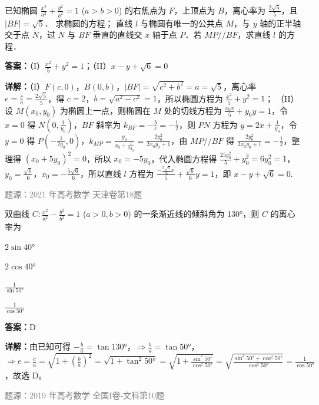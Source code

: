 \begin{question}
已知椭圆 $\frac{x^2}{a^2} + \frac{y^2}{b^2} = 1$ ($a > b > 0$) 的右焦点为 $F$，上顶点为 $B$，离心率为 $\frac{2\sqrt{5}}{5}$，且 $|BF| = \sqrt{5}$．
求椭圆的方程；
直线 $l$ 与椭圆有唯一的公共点 $M$，与 $y$ 轴的正半轴交于点 $N$，过 $N$ 与 $BF$ 垂直的直线交 $x$ 轴于点 $P$．若 $MP // BF$，求直线 $l$ 的方程．
\begin{solution}
\textbf{答案：}（I）$\frac{x^2}{5} + y^2 = 1$；（II）$x - y + \sqrt{6} = 0$

\textbf{详解：}（I）$F(c,0)$，$B(0,b)$，$|BF| = \sqrt{c^2+b^2} = a = \sqrt{5}$，离心率 $e = \frac{c}{a} = \frac{2\sqrt{5}}{5}$，得 $c=2$，$b = \sqrt{a^2-c^2} = 1$，所以椭圆方程为 $\frac{x^2}{5} + y^2 = 1$；
（II）设 $M(x_0,y_0)$ 为椭圆上一点，则椭圆在 $M$ 处的切线方程为 $\frac{x_0 x}{5} + y_0 y = 1$，令 $x=0$ 得 $N\left(0,\frac{1}{y_0}\right)$，$BF$ 斜率为 $k_{BF} = -\frac{b}{c} = -\frac{1}{2}$，则 $PN$ 方程为 $y = 2x + \frac{1}{y_0}$，令 $y=0$ 得 $P\left(-\frac{1}{2y_0},0\right)$，$k_{MP} = \frac{y_0}{x_0+\frac{1}{2y_0}} = \frac{2y_0^2}{2x_0 y_0+1}$，由 $MP // BF$ 得 $\frac{2y_0^2}{2x_0 y_0+1} = -\frac{1}{2}$，整理得 $(x_0+5y_0)^2=0$，所以 $x_0 = -5y_0$，代入椭圆方程得 $\frac{25y_0^2}{5}+y_0^2=6y_0^2=1$，$y_0 = \frac{\sqrt{6}}{6}$，$x_0 = -\frac{5\sqrt{6}}{6}$，所以直线 $l$ 方程为 $\frac{-\frac{5\sqrt{6}}{6}x}{5} + \frac{\sqrt{6}}{6}y = 1$，即 $x - y + \sqrt{6}=0$.

\textcolor{gray}{\footnotesize 题源：2021 年高考数学 天津卷第18题}
\end{solution}
\end{question}


\begin{question}
双曲线 $C: \frac{x^2}{a^2} - \frac{y^2}{b^2} = 1$ ($a>0,b>0$) 的一条渐近线的倾斜角为 130°，则 $C$ 的离心率为
\begin{choices}
\item $2\sin40°$
\item $2\cos40°$
\item $\frac{1}{\sin50°}$
\item $\frac{1}{\cos50°}$
\end{choices}
\begin{solution}
\textbf{答案：}D

\textbf{详解：}由已知可得 $-\frac{b}{a} = \tan130°$，$\Rightarrow \frac{b}{a} = \tan50°$，$\Rightarrow e = \frac{c}{a} = \sqrt{1+\left(\frac{b}{a}\right)^2} = \sqrt{1+\tan^2 50°} = \sqrt{1+\frac{\sin^2 50°}{\cos^2 50°}} = \sqrt{\frac{\sin^2 50°+\cos^2 50°}{\cos^2 50°}} = \frac{1}{\cos50°}$，故选 D。

\textcolor{gray}{\footnotesize 题源：2019 年高考数学 全国I卷-文科第10题}
\end{solution}
\end{question}

